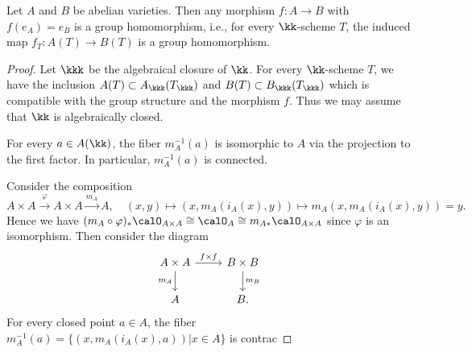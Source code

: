 
    \begin{theorem}\label{thm: structure of morphism between abelian varieties}
        Let \(A\) and \(B\) be abelian varieties. 
        Then any morphism \(f: A \to B\) with \(f(e_A) = e_B\) is a group homomorphism, i.e., for every \(\kk\)-scheme \(T\), the induced map \(f_T: A(T) \to B(T)\) is a group homomorphism.
    \end{theorem}
    \begin{proof}
        Let \(\kkk\) be the algebraical closure of \(\kk\).
        For every \(\kk\)-scheme \(T\), we have the inclusion \(A(T) \subset A_{\kkk}(T_{\kkk})\) and \(B(T) \subset B_{\kkk}(T_{\kkk})\) which is compatible with the group structure and the morphism \(f\).
        Thus we may assume that \(\kk\) is algebraically closed.

        For every \(a \in A(\kk)\), the fiber \(m_A^{-1}(a)\) is isomorphic to \(A\) via the projection to the first factor.
        In particular, \(m_A^{-1}(a)\) is connected.

        Consider the composition 
        \[ A \times A \xrightarrow{\varphi} A \times A \xrightarrow{m_A} A, \quad (x,y) \mapsto (x,m_A(i_A(x), y)) \mapsto m_A(x, m_A(i_A(x), y)) = y. \]
        Hence we have \((m_A \circ \varphi)_* \calO_{A \times A} \cong \calO_A \cong m_{A*} \calO_{A \times A}\) since \(\varphi\) is an isomorphism.
        Then consider the diagram
        \[ \begin{tikzcd}
            A \times A \arrow[r, "f \times f"] \arrow[d, "m_A"'] & B \times B \arrow[d, "m_B"] \\
            A & B.
        \end{tikzcd} \]
        For every closed point \(a \in A\), the fiber \(m_A^{-1}(a) = \{(x, m_A(i_A(x), a)) | x \in A\}\) is contrac
    \end{proof}

